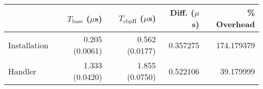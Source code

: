 \begin{tabular}{>{\ttfamily}lrrrr}
\toprule
\multicolumn{1}{l}{Type} & $T_\text{base}$ ($\mu$s) & $T_\text{ebpH}$ ($\mu$s) &  Diff. ($\mu$s) &  \% Overhead \\
\midrule
            Installation &           0.205 (0.0061) &           0.562 (0.0177) &        0.357275 &   174.179379 \\
                 Handler &           1.333 (0.0420) &           1.855 (0.0750) &        0.522106 &    39.179999 \\
\bottomrule
\end{tabular}
